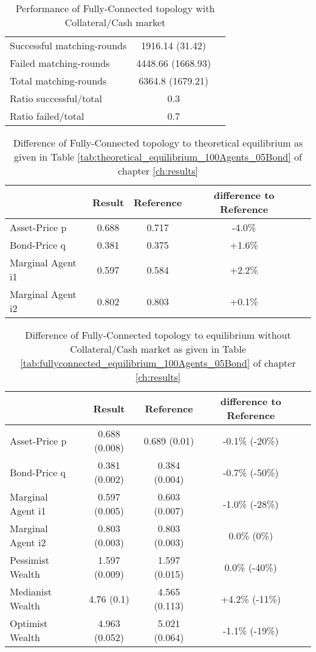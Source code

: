 \documentclass[Bachelorarbeit.tex]{subfiles}
\begin{document}
\begin{table}[H]
	\caption{Performance of Fully-Connected topology with Collateral/Cash market}
	\centering
	\begin{tabular} { l c r }
		\hline
		Successful matching-rounds & 1916.14 (31.42) \\
		Failed matching-rounds & 4448.66 (1668.93) \\
		Total matching-rounds & 6364.8 (1679.21) \\
		\hline
		Ratio successful/total & 0.3 \\
		Ratio failed/total & 0.7 \\
		\hline
	\end{tabular}
\end{table}

\begin{table}[H]
	\caption{Difference of Fully-Connected topology to theoretical equilibrium as given in Table \ref{tab:theoretical_equilibrium_100Agents_05Bond} of chapter \ref{ch:results}}
	\centering
	\begin{tabular} { l c c c r }
		& Result & Reference & difference to Reference \\
		\hline
		Asset-Price p & 0.688 & 0.717 & -4.0\% \\
		Bond-Price q & 0.381 & 0.375 & +1.6\% \\
		Marginal Agent i1 & 0.597 & 0.584 & +2.2\% \\
		Marginal Agent i2 & 0.802 & 0.803 & +0.1\% \\
		\hline
	\end{tabular}
\end{table} 

\begin{table}[H]
	\caption{Difference of Fully-Connected topology to equilibrium without Collateral/Cash market as given in Table \ref{tab:fullyconnected_equilibrium_100Agents_05Bond} of chapter \ref{ch:results}}
	\centering
	\begin{tabular} { l c c c r }
		& Result & Reference & difference to Reference \\
		\hline
		Asset-Price p & 0.688 (0.008) & 0.689 (0.01) & -0.1\% (-20\%) \\
		Bond-Price q & 0.381 (0.002) & 0.384 (0.004) & -0.7\% (-50\%) \\
		Marginal Agent i1 & 0.597 (0.005) & 0.603 (0.007) & -1.0\% (-28\%) \\
		Marginal Agent i2 & 0.803 (0.003) & 0.803 (0.003) & 0.0\% (0\%) \\
		\hline
		Pessimist Wealth & 1.597 (0.009) & 1.597 (0.015) & 0.0\% (-40\%) \\
		Medianist Wealth & 4.76 (0.1) & 4.565 (0.113) & +4.2\% (-11\%) \\
		Optimist Wealth & 4.963 (0.052) & 5.021 (0.064) & -1.1\% (-19\%) \\
		\hline
	\end{tabular}
\end{table} 
\end{document}
